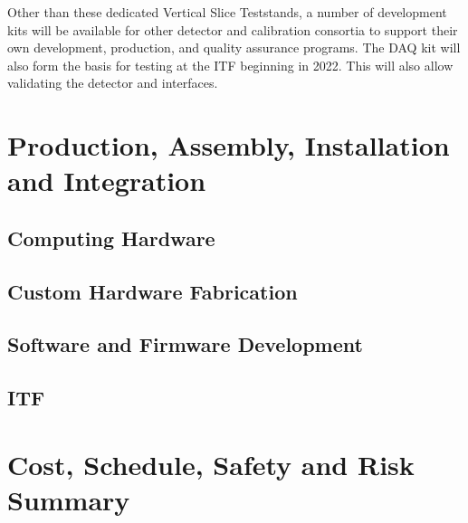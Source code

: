 Other than these dedicated Vertical Slice Teststands, a number of
 development kits will be available for other detector and
calibration consortia to support 
their own development, production, and quality assurance programs. The DAQ
kit will also form the basis for testing at the ITF beginning in 2022. This will
also allow validating the detector and  interfaces. %

\section{Production, Assembly, Installation and Integration}
\label{sec:sp-daq:production}



\subsection{Computing Hardware}

\subsection{Custom Hardware Fabrication}

\subsection{Software and Firmware Development}

\subsection{ITF}

\section{Cost, Schedule, Safety and Risk Summary}
\label{sec:sp-daq:cost}

